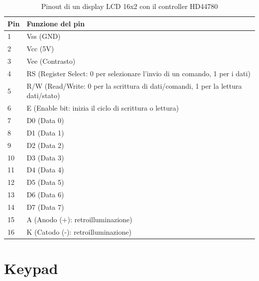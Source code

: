 \documentclass[12pt]{report}
\begin{document}
\begin{table}[h!]
	\begin{center}
		\begin{tabular}{l|l} 
			\textbf{Pin} & \textbf{Funzione del pin} \\
			\hline
			1 & Vss (GND) \\
			2 & Vcc (5V) \\ 
			3 & Vee (Contrasto) \\
			4 & RS (Register Select: 0 per selezionare l'invio di un comando, 1 per i dati) \\
			5 & R/W (Read/Write: 0 per la scrittura di dati/comandi, 1 per la lettura dati/stato) \\
			6 & E (Enable bit: inizia il ciclo di scrittura o lettura) \\
			7 & D0 (Data 0) \\
			8 & D1 (Data 1) \\
			9 & D2 (Data 2) \\
			10 & D3 (Data 3) \\
			11 & D4 (Data 4) \\
			12 & D5 (Data 5) \\
			13 & D6 (Data 6) \\
			14 & D7 (Data 7) \\
			15 & A (Anodo (+): retroilluminazione) \\
			16 & K (Catodo (-): retroilluminazione) \\
		\end{tabular}
	\caption{Pinout di un display LCD 16x2 con il controller HD44780}
	\label{tab:lcd_pinout}
	\end{center}
\end{table}

%
\section{Keypad}
%
\end{document}
